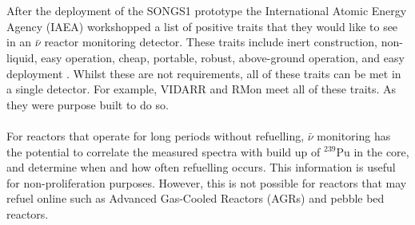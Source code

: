 \\\\After the deployment of the SONGS1 prototype the International Atomic Energy Agency (IAEA) workshopped a list of positive traits that they would like to see in an $\bar{\nu}$ reactor monitoring detector. These traits include inert construction, non-liquid, easy operation, cheap, portable, robust, above-ground operation, and easy deployment \cite{IAEA_2008}. Whilst these are not requirements, all of these traits can be met in a single detector. For example, VIDARR and RMon meet all of these traits. As they were purpose built to do so. 
\\\\For reactors that operate for long periods without refuelling, $\bar{\nu}$ monitoring has the potential to correlate the measured spectra with build up of $^{239}$Pu in the core, and determine when and how often refuelling occurs. This information is useful for non-proliferation purposes. However, this is not possible for reactors that may refuel online such as Advanced Gas-Cooled Reactors (AGRs) and pebble bed reactors.

